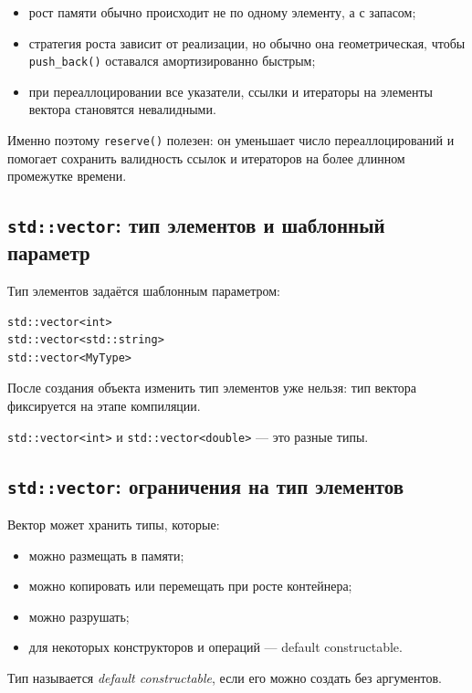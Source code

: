 \begin{itemize}
    \item рост памяти обычно происходит не по одному элементу, а с запасом;
    \item стратегия роста зависит от реализации, но обычно она геометрическая, чтобы \texttt{push\_back()} оставался амортизированно быстрым;
    \item при переаллоцировании все указатели, ссылки и итераторы на элементы вектора становятся невалидными.
\end{itemize}

\begin{remark}
Именно поэтому \texttt{reserve()} полезен: он уменьшает число переаллоцирований и помогает сохранить валидность ссылок и итераторов на более длинном промежутке времени.
\end{remark}

\subsection{\texttt{std::vector}: тип элементов и шаблонный параметр}
Тип элементов задаётся шаблонным параметром:
\begin{verbatim}
std::vector<int>
std::vector<std::string>
std::vector<MyType>
\end{verbatim}

После создания объекта изменить тип элементов уже нельзя: тип вектора фиксируется на этапе компиляции.

\begin{remark}
\texttt{std::vector<int>} и \texttt{std::vector<double>} — это разные типы.
\end{remark}

\subsection{\texttt{std::vector}: ограничения на тип элементов}
Вектор может хранить типы, которые:
\begin{itemize}
    \item можно размещать в памяти;
    \item можно копировать или перемещать при росте контейнера;
    \item можно разрушать;
    \item для некоторых конструкторов и операций — default constructable.
\end{itemize}

\begin{definition}
Тип называется \textit{default constructable}, если его можно создать без аргументов.
\end{definition}

